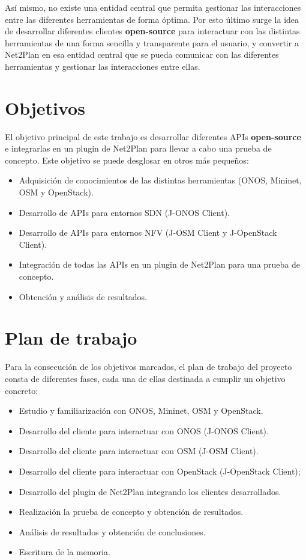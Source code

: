 Así mismo, no existe una entidad central que permita gestionar las interacciones entre las diferentes herramientas de forma óptima. Por esto último surge la idea de desarrollar diferentes clientes \textbf{open-source} para interactuar con las distintas herramientas de una forma sencilla y transparente para el usuario, y convertir a Net2Plan en esa entidad central que se pueda comunicar con las diferentes herramientas y gestionar las interacciones entre ellas.

\section{Objetivos}

El objetivo principal de este trabajo es desarrollar diferentes \acp{API} \textbf{open-source} e integrarlas en un plugin de Net2Plan para llevar a cabo una prueba de concepto. Este objetivo se puede desglosar en otros más pequeños:

\begin{itemize}
	\item Adquisición de conocimientos de las distintas herramientas (\ac{ONOS}, Mininet, \ac{OSM} y OpenStack). 
	\item Desarrollo de \acp{API} para entornos \ac{SDN} (J-ONOS Client).
	\item Desarrollo de \acp{API} para entornos \ac{NFV} (J-OSM Client y J-OpenStack Client).
	\item Integración de todas las \acp{API} en un plugin de Net2Plan para una prueba de concepto.
	\item Obtención y análisis de resultados.
\end{itemize}

\section{Plan de trabajo}

Para la consecución de los objetivos marcados, el plan de trabajo del proyecto consta de diferentes fases, cada una de ellas destinada a cumplir un objetivo concreto:

\begin{itemize}
	\item Estudio y familiarización con \ac{ONOS}, Mininet, \ac{OSM} y OpenStack.
	\item Desarrollo del cliente para interactuar con \ac{ONOS} (J-ONOS Client).
	\item Desarrollo del cliente para interactuar con \ac{OSM} (J-OSM Client).
	\item Desarrollo del cliente para interactuar con OpenStack (J-OpenStack Client);
	\item Desarrollo del plugin de Net2Plan integrando los clientes desarrollados.
	\item Realización la prueba de concepto y obtención de resultados.
	\item Análisis de resultados y obtención de conclusiones.
	\item Escritura de la memoria.
\end{itemize}

